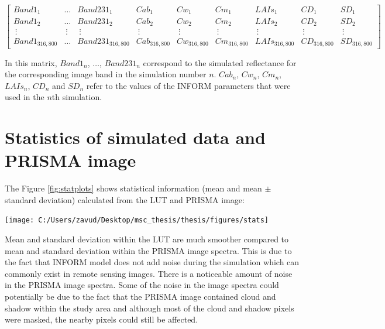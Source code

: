 \documentclass[a4paper, twoside]{templates/ociamthesis}
\let\origfigure\figure
\let\endorigfigure\endfigure
\renewenvironment{figure}[1][2] {
    \expandafter\origfigure\expandafter[H]
} {
    \endorigfigure
}
\begin{document}
\begingroup
\tiny

\[
\begin{bmatrix}
Band1_{1} & \dots & Band231_{1} & Cab_{1} & Cw_{1} & Cm_{1} & LAIs_{1} & CD_{1} & SD_{1}\\
Band1_{2} & \dots & Band231_{2} & Cab_{2} & Cw_{2} & Cm_{2} & LAIs_{2} & CD_{2} & SD_{2}\\
\ \vdots  &\ \vdots &\ \vdots &\ \vdots &\ \vdots &\ \vdots &\ \vdots &\ \vdots &\ \vdots\\
Band1_{316,800} & \dots & Band231_{316,800} & Cab_{316,800} & Cw_{316,800} & Cm_{316,800} & LAIs_{316,800} & CD_{316,800} & SD_{316,800}
\end{bmatrix}
\]
\endgroup

In this matrix, \(Band1_{n}\), \(\dots\), \(Band231_{n}\) correspond to the simulated reflectance for the corresponding image band in the simulation number \(n\). \(Cab_{n}\), \(Cw_{n}\), \(Cm_{n}\), \(LAIs_{n}\), \(CD_{n}\) and \(SD_{n}\) refer to the values of the INFORM parameters that were used in the \(n\)th simulation.

\hypertarget{statistics-of-simulated-data-and-prisma-image-1}{%
\section{Statistics of simulated data and PRISMA image}\label{statistics-of-simulated-data-and-prisma-image-1}}

The Figure \ref{fig:statplots} shows statistical information (mean and mean \(\pm\) standard deviation) calculated from the LUT and PRISMA image:

\begin{figure}
\texttt{[image: C:/Users/zavud/Desktop/msc\_thesis/thesis/figures/stats]} \caption{Mean and mean $\pm$ standard deviation in the a) LUT and b) PRISMA image}\label{fig:statplots}
\end{figure}

Mean and standard deviation within the LUT are much smoother compared to mean and standard deviation within the PRISMA image spectra. This is due to the fact that INFORM model does not add noise during the simulation which can commonly exist in remote sensing images. There is a noticeable amount of noise in the PRISMA image spectra. Some of the noise in the image spectra could potentially be due to the fact that the PRISMA image contained cloud and shadow within the study area and although most of the cloud and shadow pixels were masked, the nearby pixels could still be affected.
\end{document}
